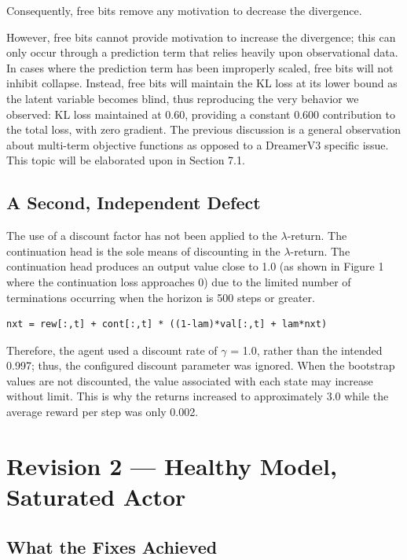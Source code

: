 \documentclass[12pt,a4paper,oneside]{report}
\begin{document}
Consequently, free bits remove any motivation to decrease the divergence.

However, free bits cannot provide motivation to increase the divergence; this can only occur through a prediction term that relies heavily upon observational data. In cases where the prediction term has been improperly scaled, free bits will not inhibit collapse. Instead, free bits will maintain the KL loss at its lower bound as the latent variable becomes blind, thus reproducing the very behavior we observed: KL loss maintained at 0.60, providing a constant 0.600 contribution to the total loss, with zero gradient. The previous discussion is a general observation about multi-term objective functions as opposed to a DreamerV3 specific issue. This topic will be elaborated upon in Section 7.1.

\hypertarget{a-second-independent-defect}{%
\subsection{A Second, Independent Defect}\label{a-second-independent-defect}}
The use of a discount factor has not been applied to the $\lambda$-return. The continuation head is the sole means of discounting in the $\lambda$-return. The continuation head produces an output value close to 1.0 (as shown in Figure 1 where the continuation loss approaches 0) due to the limited number of terminations occurring when the horizon is 500 steps or greater.

\begin{verbatim}
nxt = rew[:,t] + cont[:,t] * ((1-lam)*val[:,t] + lam*nxt)
\end{verbatim}

Therefore, the agent used a discount rate of $\gamma$ = 1.0, rather than the intended 0.997; thus, the configured discount parameter was ignored. When the bootstrap values are not discounted, the value associated with each state may increase without limit. This is why the returns increased to approximately 3.0 while the average reward per step was only 0.002.

\hypertarget{revision-2-healthy-model-saturated-actor}{%
\section{Revision 2 --- Healthy Model, Saturated Actor}\label{revision-2-healthy-model-saturated-actor}}

\hypertarget{what-the-fixes-achieved}{%
\subsection{What the Fixes Achieved}\label{what-the-fixes-achieved}}
\end{document}

